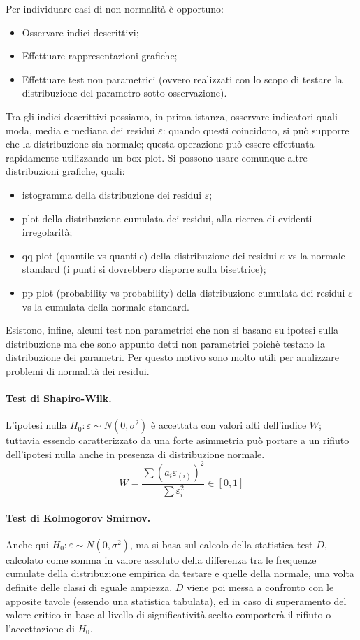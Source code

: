 \documentclass[a4page, 11pt]{article} %
\begin{document}
Per individuare casi di non normalità è opportuno:
\begin{itemize}[noitemsep]
\item Osservare indici descrittivi;
\item Effettuare rappresentazioni grafiche;
\item Effettuare test non parametrici (ovvero realizzati con lo scopo di testare la distribuzione del parametro sotto osservazione).
\end{itemize}
Tra gli indici descrittivi possiamo, in prima istanza, osservare indicatori quali moda, media e mediana dei residui $\varepsilon$: quando questi coincidono, si può supporre che la distribuzione sia normale; questa operazione può essere effettuata rapidamente utilizzando un box-plot.
Si possono usare comunque altre distribuzioni grafiche, quali:
\begin{itemize}[noitemsep]
  \item istogramma della distribuzione dei residui $\varepsilon$;
  \item plot della distribuzione cumulata dei residui, alla ricerca di evidenti irregolarità;
  \item qq-plot (quantile vs quantile) della distribuzione dei residui $\varepsilon$ vs la normale standard (i punti si dovrebbero disporre sulla bisettrice);
  \item pp-plot (probability vs probability) della distribuzione cumulata dei residui $\varepsilon$ vs la cumulata della normale standard. 
\end{itemize}
Esistono, infine, alcuni test non parametrici che non si basano su ipotesi sulla distribuzione ma che sono appunto detti non parametrici poichè testano la distribuzione dei parametri. Per questo motivo sono molto utili per analizzare problemi di normalità dei residui.

\paragraph{Test di Shapiro-Wilk.} L'ipotesi nulla $H_0 : \varepsilon \sim N(0, \sigma^2)$ è accettata con valori alti dell'indice $W$; tuttavia essendo caratterizzato da una forte asimmetria può portare a un rifiuto dell'ipotesi nulla anche in presenza di distribuzione normale.
\begin{equation*}
W = \frac{\sum(a_i \varepsilon_{(i)})^2}{\sum\varepsilon_i^2} \in [0, 1]
\end{equation*}

\paragraph{Test di Kolmogorov Smirnov.} Anche qui $H_0 : \varepsilon \sim N(0, \sigma^2)$, ma si basa sul calcolo della statistica test $D$, calcolato come somma in valore assoluto della differenza tra le frequenze cumulate della distribuzione empirica da testare e quelle della normale, una volta definite delle classi di eguale ampiezza.
$D$ viene poi messa a confronto con le apposite tavole (essendo una statistica tabulata), ed in caso di superamento del valore critico in base al livello di significatività scelto comporterà il rifiuto o l'accettazione di $H_0$.
\end{document}
